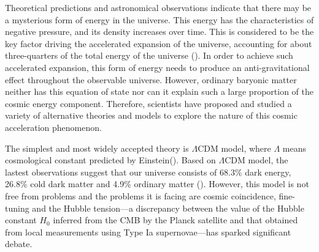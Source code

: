 \documentclass[manuscript]{aastex631}
\begin{document}
Theoretical predictions and astronomical observations indicate that there may be a mysterious form of energy in the universe. This energy has the characteristics of negative pressure, and its density increases over time. This is considered to be the key factor driving the accelerated expansion of the universe, accounting for about three-quarters of the total energy of the universe (\cite{PhysRevD.37.3406,PhysRevD.63.103510,10.1143/PTP.106.929}). In order to achieve such accelerated expansion, this form of energy needs to produce an anti-gravitational effect throughout the observable universe. However, ordinary baryonic matter neither has this equation of state nor can it explain such a large proportion of the cosmic energy component. Therefore, scientists have proposed and studied a variety of alternative theories and models to explore the nature of this cosmic acceleration phenomenon.

The simplest and most widely accepted theory is $\Lambda \text{CDM}$ model, where $\Lambda$ means cosmological constant predicted by Einstein(\cite{Carroll_2001}).
Based on $\Lambda \text{CDM}$ model, the lastest observations suggest that our universe consists of 68.3\% dark energy, 26.8\% cold dark matter and 4.9\% ordinary matter (\cite{2020Planck}). However, this model is not free from problems and the problems it is facing are cosmic coincidence, fine-tuning and the Hubble tension—a discrepancy between the value of the Hubble constant $H_0$ inferred from the CMB by the Planck satellite and that obtained from local measurements using Type Ia supernovae—has sparked significant debate. 
\end{document}
